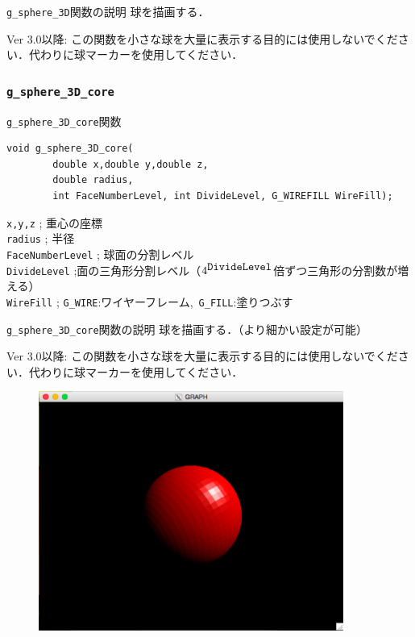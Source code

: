 \documentclass[a4paper,12pt]{jsarticle}%
\begin{document}
\begin{itembox}[l]{\texttt{g\_sphere\_3D}関数の説明}
球を描画する．

Ver 3.0以降: この関数を小さな球を大量に表示する目的には使用しないでください．代わりに球マーカーを使用してください．
\end{itembox}


\clearpage
\subsubsection{\texttt{g\_sphere\_3D\_core}}

\begin{itembox}[l]{\texttt{g\_sphere\_3D\_core}関数}
\begin{verbatim}
void g_sphere_3D_core(
        double x,double y,double z,
        double radius,
        int FaceNumberLevel, int DivideLevel, G_WIREFILL WireFill);   
\end{verbatim}
\verb|x,y,z| ; 重心の座標\\
\verb|radius| ; 半径\\
\verb|FaceNumberLevel| ; 球面の分割レベル\\
\verb|DivideLevel| ;面の三角形分割レベル（$4^{\verb|DivideLevel|}$倍ずつ三角形の分割数が増える）\\
\verb|WireFill| ; \verb|G_WIRE|:ワイヤーフレーム,\ \verb|G_FILL|:塗りつぶす \\
\end{itembox}

\begin{itembox}[l]{\texttt{g\_sphere\_3D\_core}関数の説明}
球を描画する．（より細かい設定が可能）

Ver 3.0以降: この関数を小さな球を大量に表示する目的には使用しないでください．代わりに球マーカーを使用してください．
\end{itembox}

\begin{figure}[htb]
	\includegraphics[width=100mm]{./Figures/eps/Canvas_g_sphere.eps}
\end{figure}
\end{document}
